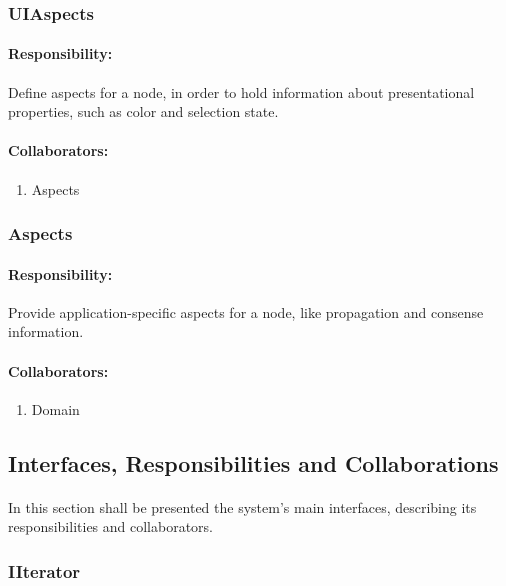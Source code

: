 \documentclass[a4paper,10pt]{article}
\begin{document}
	  \subsubsection{UIAspects}

\paragraph{Responsibility:} Define aspects for a node, in order to hold information about presentational properties, such as color and selection state.
	  \paragraph{Collaborators:}
      \begin{enumerate}
       \item Aspects
      \end{enumerate}
	  
	  \subsubsection{Aspects}

\paragraph{Responsibility:} Provide application-specific aspects for a node, like propagation and consense information.
\paragraph{Collaborators:}
      \begin{enumerate}
       \item Domain
      \end{enumerate}


\subsection{Interfaces, Responsibilities and Collaborations}

\paragraph{}
In this section shall be presented the system's main interfaces, describing its responsibilities and collaborators. 

  \subsubsection{IIterator}
\end{document}
